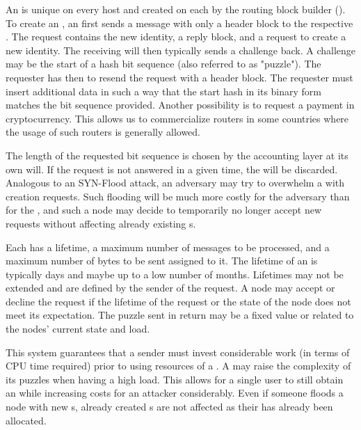 An  is unique on every host and created on each \VortexNode{} by the routing block builder (). To create an , an  first sends a message with only a header block to the respective \VortexNode. The request contains the new identity, a reply block, and a request to create a new identity. The receiving \VortexNode will then typically sends a challenge back. A challenge may be the start of a hash bit sequence (also referred to as "puzzle"). The requester has then to resend the request with a header block. The requester must insert additional data in such a way that the start hash in its binary form matches the bit sequence provided. Another possibility is to request a payment in cryptocurrency. This allows us to commercialize routers in some countries where the usage of such routers is generally allowed.

The length of the requested bit sequence is chosen by the accounting layer at its own will. If the request is not answered in a given time, the  will be discarded. Analogous to an SYN-Flood attack, an adversary may try to overwhelm a \VortexNode{} with  creation requests. Such flooding will be much more costly for the adversary than for the \VortexNode{}, and such a node may decide to temporarily no longer accept new  requests without affecting already existing s.

Each  has a lifetime, a maximum number of messages to be processed, and a maximum number of bytes to be sent assigned to it. The lifetime of an  is typically days and maybe up to a low number of months. Lifetimes may not be extended and are defined by the sender of the request. A node may accept or decline the request if the lifetime of the request or the state of the node does not meet its expectation. The puzzle sent in return may be a fixed value or related to the nodes' current state and load.

This system guarantees that a sender must invest considerable work (in terms of CPU time required) prior to using resources of a \VortexNode. A \VortexNode{} may raise the complexity of its puzzles when having a  high load. This allows for a single user to still obtain an  while increasing costs for an attacker considerably. Even if someone floods a node with new s, already created s are not affected as their  has already been allocated.

